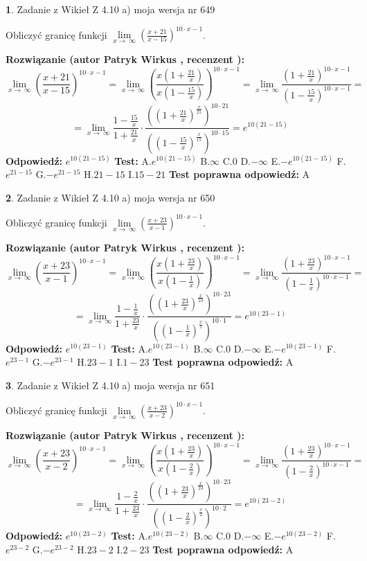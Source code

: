 \documentclass[12pt, a4paper]{article}
\theoremstyle{definition} %
\newtheorem{zad}{}
\newcommand{\zadStart}[1]{\begin{zad}#1\newline}
\newcommand{\zadStop}{\end{zad}}
\newcommand{\rozwStart}[2]{\noindent \textbf{Rozwiązanie (autor #1 , recenzent #2): }\newline}
\newcommand{\rozwStop}{\newline}
\newcommand{\odpStart}{\noindent \textbf{Odpowiedź:}\newline}
\newcommand{\odpStop}{\newline}
\newcommand{\testStart}{\noindent \textbf{Test:}\newline}
\newcommand{\testStop}{\newline}
\newcommand{\kluczStart}{\noindent \textbf{Test poprawna odpowiedź:}\newline}
\newcommand{\kluczStop}{\newline}
\begin{document}
\zadStart{Zadanie z Wikieł Z 4.10 a) moja wersja nr 649}


Obliczyć granicę funkcji  $\lim\limits_{x\to\ \infty}(\frac{x+21}{x-15})^{10\cdot x-1}$.
\zadStop
\rozwStart{Patryk Wirkus}{}
$$\lim\limits_{x\to\ \infty}(\frac{x+21}{x-15})^{10\cdot x-1} = \lim\limits_{x\to\ \infty}(\frac{x(1+\frac{21}{x})}{x(1-\frac{15}{x})})^{10\cdot x-1}=\lim\limits_{x\to\ \infty}\frac{(1+\frac{21}{x})^{10\cdot x-1}}{(1-\frac{15}{x})^{10\cdot x-1}}=$$
$$=\lim\limits_{x\to\ \infty}\frac{1-\frac{15}{x}}{1+\frac{21}{x}}\cdot\frac{((1+\frac{21}{x})^{\frac{x}{21}})^{10\cdot21}}{((1-\frac{15}{x})^{\frac{x}{15}})^{10\cdot15}}=e^{10(21-15)}$$
\rozwStop
\odpStart
$e^{10(21-15)}$
\odpStop
\testStart
A.$e^{10(21-15)}$ B.$\infty$ C.$0$ D.$-\infty$ E.$-e^{10(21-15)}$
F.$e^{21-15}$ G.$-e^{21-15}$
H.$21-15$
I.$15-21$
\testStop
\kluczStart
A
\kluczStop



\zadStart{Zadanie z Wikieł Z 4.10 a) moja wersja nr 650}


Obliczyć granicę funkcji  $\lim\limits_{x\to\ \infty}(\frac{x+23}{x-1})^{10\cdot x-1}$.
\zadStop
\rozwStart{Patryk Wirkus}{}
$$\lim\limits_{x\to\ \infty}(\frac{x+23}{x-1})^{10\cdot x-1} = \lim\limits_{x\to\ \infty}(\frac{x(1+\frac{23}{x})}{x(1-\frac{1}{x})})^{10\cdot x-1}=\lim\limits_{x\to\ \infty}\frac{(1+\frac{23}{x})^{10\cdot x-1}}{(1-\frac{1}{x})^{10\cdot x-1}}=$$
$$=\lim\limits_{x\to\ \infty}\frac{1-\frac{1}{x}}{1+\frac{23}{x}}\cdot\frac{((1+\frac{23}{x})^{\frac{x}{23}})^{10\cdot23}}{((1-\frac{1}{x})^{\frac{x}{1}})^{10\cdot1}}=e^{10(23-1)}$$
\rozwStop
\odpStart
$e^{10(23-1)}$
\odpStop
\testStart
A.$e^{10(23-1)}$ B.$\infty$ C.$0$ D.$-\infty$ E.$-e^{10(23-1)}$
F.$e^{23-1}$ G.$-e^{23-1}$
H.$23-1$
I.$1-23$
\testStop
\kluczStart
A
\kluczStop



\zadStart{Zadanie z Wikieł Z 4.10 a) moja wersja nr 651}


Obliczyć granicę funkcji  $\lim\limits_{x\to\ \infty}(\frac{x+23}{x-2})^{10\cdot x-1}$.
\zadStop
\rozwStart{Patryk Wirkus}{}
$$\lim\limits_{x\to\ \infty}(\frac{x+23}{x-2})^{10\cdot x-1} = \lim\limits_{x\to\ \infty}(\frac{x(1+\frac{23}{x})}{x(1-\frac{2}{x})})^{10\cdot x-1}=\lim\limits_{x\to\ \infty}\frac{(1+\frac{23}{x})^{10\cdot x-1}}{(1-\frac{2}{x})^{10\cdot x-1}}=$$
$$=\lim\limits_{x\to\ \infty}\frac{1-\frac{2}{x}}{1+\frac{23}{x}}\cdot\frac{((1+\frac{23}{x})^{\frac{x}{23}})^{10\cdot23}}{((1-\frac{2}{x})^{\frac{x}{2}})^{10\cdot2}}=e^{10(23-2)}$$
\rozwStop
\odpStart
$e^{10(23-2)}$
\odpStop
\testStart
A.$e^{10(23-2)}$ B.$\infty$ C.$0$ D.$-\infty$ E.$-e^{10(23-2)}$
F.$e^{23-2}$ G.$-e^{23-2}$
H.$23-2$
I.$2-23$
\testStop
\kluczStart
A
\kluczStop
\end{document}
